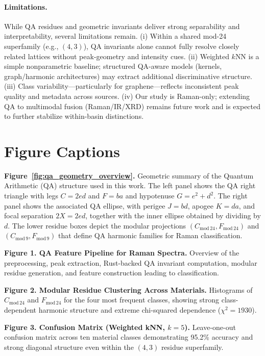 \documentclass[12pt]{article}
\begin{document}
\paragraph{Limitations.}
While QA residues and geometric invariants deliver strong separability and interpretability, several
limitations remain. (i) Within a shared mod-24 superfamily (e.g., $(4,3)$), QA invariants alone cannot
fully resolve closely related lattices without peak-geometry and intensity cues. (ii) Weighted $k$NN is a
simple nonparametric baseline; structured QA-aware models (kernels, graph/harmonic architectures) may
extract additional discriminative structure. (iii) Class variability—particularly for graphene—reflects
inconsistent peak quality and metadata across sources. (iv) Our study is Raman-only; extending QA to
multimodal fusion (Raman/IR/XRD) remains future work and is expected to further stabilize within-basin
distinctions.

\section*{Figure Captions}

\noindent\textbf{Figure~\ref{fig:qa_geometry_overview}.}
Geometric summary of the Quantum Arithmetic (QA) structure used in this work. The left panel shows the QA
right triangle with legs $C = 2 e d$ and $F = b a$ and hypotenuse $G = e^{2} + d^{2}$. The right panel
shows the associated QA ellipse, with perigee $J = b d$, apogee $K = d a$, and focal separation
$2X = 2 e d$, together with the inner ellipse obtained by dividing by $d$. The lower residue boxes depict
the modular projections $(C_{\mathrm{mod}\,24},F_{\mathrm{mod}\,24})$ and $(C_{\mathrm{mod}\,9},F_{\mathrm{mod}\,9})$
that define QA harmonic families for Raman classification.

\noindent\textbf{Figure 1. QA Feature Pipeline for Raman Spectra.}
Overview of the preprocessing, peak extraction, Rust-backed QA invariant computation, modular residue
generation, and feature construction leading to classification.

\noindent\textbf{Figure 2. Modular Residue Clustering Across Materials.}
Histograms of $C_{\mathrm{mod}\,24}$ and $F_{\mathrm{mod}\,24}$ for the four most frequent classes,
showing strong class-dependent harmonic structure and extreme chi-squared dependence ($\chi^2 = 1930$).

\noindent\textbf{Figure 3. Confusion Matrix (Weighted kNN, $k=5$).}
Leave-one-out confusion matrix across ten material classes demonstrating 95.2\% accuracy and strong diagonal
structure even within the $(4,3)$ residue superfamily.
\end{document}
